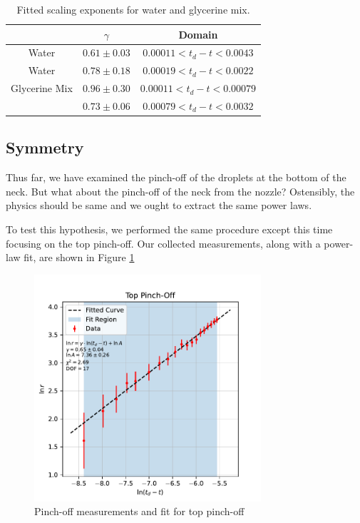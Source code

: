 \documentclass[12pt, letterpaper]{article}
\begin{document}
\begin{table}[!h]
    \centering
    \begin{tabular}{|c|c|c|}
        \hline
         & $\gamma$ & Domain \\
        \hline
        Water & $0.61 \pm 0.03$ & $0.00011 < t_d - t < 0.0043$ \\
        \hline
        Water & $0.78 \pm 0.18$ & $0.00019 < t_d - t < 0.0022$ \\
        \hline
        Glycerine Mix  & $0.96 \pm 0.30$ & $0.00011 < t_d - t < 0.00079$ \\
        & $0.73 \pm 0.06$ & $0.00079 < t_d - t < 0.0032$ \\
        \hline
    \end{tabular}
    \caption{Fitted scaling exponents for water and glycerine mix. }
    \label{tab:exponents}
\end{table}

\subsection{Symmetry}

Thus far, we have examined the pinch-off of the droplets at the bottom of the neck. But what about the pinch-off of the neck from the nozzle? Ostensibly, the physics should be same and we ought to extract the same power laws. 

To test this hypothesis, we performed the same procedure except this time focusing on the top pinch-off. Our collected measurements, along with a power-law fit, are shown in Figure \ref{fig:top-pinchoff}

\begin{figure}[!h]
    \centering
    \includegraphics[width=0.75\textwidth]{experiment3/figures/plots/6top.pdf}
    \caption{Pinch-off measurements and fit for top pinch-off}
    \label{fig:top-pinchoff}
\end{figure}
\end{document}
